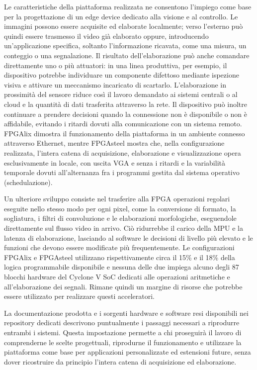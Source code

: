 \documentclass[a4paper,12pt]{article}
\begin{document}
Le caratteristiche della piattaforma realizzata ne consentono l'impiego come base per la progettazione di un edge device dedicato alla visione e al controllo. Le immagini possono essere acquisite ed elaborate localmente; verso l'esterno può quindi essere trasmesso il video già elaborato oppure, introducendo un'applicazione specifica, soltanto l'informazione ricavata, come una misura, un conteggio o una segnalazione. Il risultato dell'elaborazione può anche comandare direttamente uno o più attuatori: in una linea produttiva, per esempio, il dispositivo potrebbe individuare un componente difettoso mediante ispezione visiva e attivare un meccanismo incaricato di scartarlo. L'elaborazione in prossimità del sensore riduce così il lavoro demandato ai sistemi centrali o al cloud e la quantità di dati trasferita attraverso la rete. Il dispositivo può inoltre continuare a prendere decisioni quando la connessione non è disponibile o non è affidabile, evitando i ritardi dovuti alla comunicazione con un sistema remoto. FPGAlix dimostra il funzionamento della piattaforma in un ambiente connesso attraverso Ethernet, mentre FPGAsteel mostra che, nella configurazione realizzata, l'intera catena di acquisizione, elaborazione e visualizzazione opera esclusivamente in locale, con uscita VGA e senza i ritardi e la variabilità temporale dovuti all'alternanza fra i programmi gestita dal sistema operativo (schedulazione).

Un ulteriore sviluppo consiste nel trasferire alla FPGA operazioni regolari eseguite nello stesso modo per ogni pixel, come la conversione di formato, la sogliatura, i filtri di convoluzione e le elaborazioni morfologiche, eseguendole direttamente sul flusso video in arrivo. Ciò ridurrebbe il carico della MPU e la latenza di elaborazione, lasciando al software le decisioni di livello più elevato e le funzioni che devono essere modificate più frequentemente. Le configurazioni FPGAlix e FPGAsteel utilizzano rispettivamente circa il 15\% e il 18\% della logica programmabile disponibile e nessuna delle due impiega alcuno degli 87 blocchi hardware del Cyclone V SoC dedicati alle operazioni aritmetiche e all'elaborazione dei segnali. Rimane quindi un margine di risorse che potrebbe essere utilizzato per realizzare questi acceleratori.

La documentazione prodotta e i sorgenti hardware e software resi disponibili nei repository dedicati descrivono puntualmente i passaggi necessari a riprodurre entrambi i sistemi. Questa impostazione permette a chi proseguirà il lavoro di comprenderne le scelte progettuali, riprodurne il funzionamento e utilizzare la piattaforma come base per applicazioni personalizzate ed estensioni future, senza dover ricostruire da principio l'intera catena di acquisizione ed elaborazione.
\end{document}
